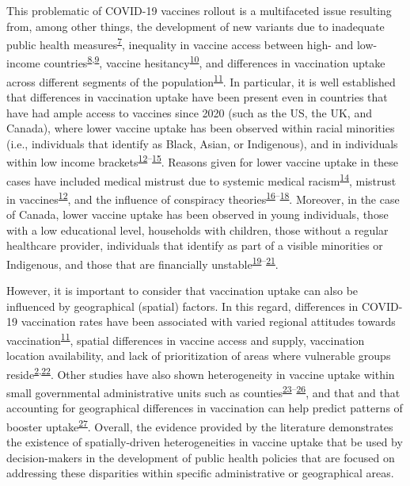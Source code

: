\documentclass[
  letterpaper,
  DIV=11,
  numbers=noendperiod]{scrartcl}
\begin{document}
This problematic of COVID-19 vaccines rollout is a multifaceted issue
resulting from, among other things, the development of new variants due
to inadequate public health
measures\textsuperscript{\protect\hyperlink{ref-li2021}{7}}, inequality
in vaccine access between high- and low-income
countries\textsuperscript{\protect\hyperlink{ref-gerretsen2021}{8},\protect\hyperlink{ref-tamey2022}{9}},
vaccine
hesitancy\textsuperscript{\protect\hyperlink{ref-nafilyan2021}{10}}, and
differences in vaccination uptake across different segments of the
population\textsuperscript{\protect\hyperlink{ref-malik2020}{11}}. In
particular, it is well established that differences in vaccination
uptake have been present even in countries that have had ample access to
vaccines since 2020 (such as the US, the UK, and Canada), where lower
vaccine uptake has been observed within racial minorities (i.e.,
individuals that identify as Black, Asian, or Indigenous), and in
individuals within low income
brackets\textsuperscript{\protect\hyperlink{ref-willis2021}{12}--\protect\hyperlink{ref-khubchandani2021}{15}}.
Reasons given for lower vaccine uptake in these cases have included
medical mistrust due to systemic medical
racism\textsuperscript{\protect\hyperlink{ref-stoler2021}{14}}, mistrust
in vaccines\textsuperscript{\protect\hyperlink{ref-willis2021}{12}}, and
the influence of conspiracy
theories\textsuperscript{\protect\hyperlink{ref-bogart2021}{16}--\protect\hyperlink{ref-freeman2020}{18}}.
Moreover, in the case of Canada, lower vaccine uptake has been observed
in young individuals, those with a low educational level, households
with children, those without a regular healthcare provider, individuals
that identify as part of a visible minorities or Indigenous, and those
that are financially
unstable\textsuperscript{\protect\hyperlink{ref-guay2022}{19}--\protect\hyperlink{ref-hussain2022}{21}}.

However, it is important to consider that vaccination uptake can also be
influenced by geographical (spatial) factors. In this regard,
differences in COVID-19 vaccination rates have been associated with
varied regional attitudes towards
vaccination\textsuperscript{\protect\hyperlink{ref-malik2020}{11}},
spatial differences in vaccine access and supply, vaccination location
availability, and lack of prioritization of areas where vulnerable
groups
reside\textsuperscript{\protect\hyperlink{ref-bogoch2022}{2},\protect\hyperlink{ref-nguyen2021}{22}}.
Other studies have also shown heterogeneity in vaccine uptake within
small governmental administrative units such as
counties\textsuperscript{\protect\hyperlink{ref-mollalo2021}{23}--\protect\hyperlink{ref-bhuiyan2022}{26}},
and that and that accounting for geographical differences in vaccination
can help predict patterns of booster
uptake\textsuperscript{\protect\hyperlink{ref-wood2022}{27}}. Overall,
the evidence provided by the literature demonstrates the existence of
spatially-driven heterogeneities in vaccine uptake that be used by
decision-makers in the development of public health policies that are
focused on addressing these disparities within specific administrative
or geographical areas.
\end{document}
